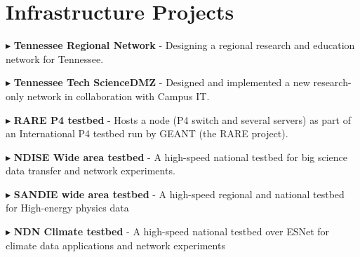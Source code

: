 
\section{Infrastructure Projects}
\begin{cvlist}

\item $\blacktriangleright$  \textbf{Tennessee Regional Network} - Designing a regional research and education network for Tennessee.


\item $\blacktriangleright$  \textbf{Tennessee Tech ScienceDMZ} - Designed and implemented a new research-only network in collaboration with Campus IT.


\item $\blacktriangleright$  \textbf{RARE P4 testbed} - Hosts a node (P4 switch and several servers) as part of an International P4 testbed run by GEANT (the RARE project).


\item $\blacktriangleright$  \textbf{NDISE Wide area testbed} - A high-speed national testbed for big science data transfer and network experiments.

\item $\blacktriangleright$  \textbf{SANDIE wide area testbed} - A high-speed regional and national testbed for High-energy physics data

\item $\blacktriangleright$  \textbf{NDN Climate testbed} - A high-speed national testbed over ESNet for climate data applications and network experiments

\end{cvlist}
